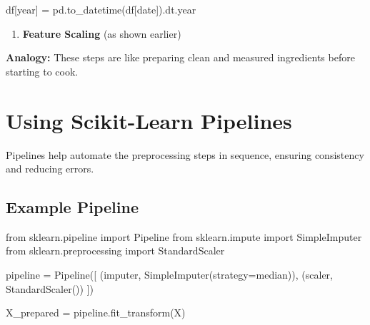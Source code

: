 \documentclass[
  letterpaper,
  DIV=11,
  numbers=noendperiod]{scrreprt}
\newenvironment{Shaded}{\begin{snugshade}}{\end{snugshade}}
\newcommand{\ImportTok}[1]{\textcolor[rgb]{0.00,0.46,0.62}{#1}}
\newcommand{\NormalTok}[1]{\textcolor[rgb]{0.00,0.23,0.31}{#1}}
\newcommand{\OperatorTok}[1]{\textcolor[rgb]{0.37,0.37,0.37}{#1}}
\newcommand{\StringTok}[1]{\textcolor[rgb]{0.13,0.47,0.30}{#1}}
\providecommand{\tightlist}{%
  \setlength{\itemsep}{0pt}\setlength{\parskip}{0pt}}\usepackage{longtable,booktabs,array}
\begin{document}
\begin{Shaded}
\begin{Highlighting}[]
\NormalTok{df[}\StringTok{\textquotesingle{}year\textquotesingle{}}\NormalTok{] }\OperatorTok{=}\NormalTok{ pd.to\_datetime(df[}\StringTok{\textquotesingle{}date\textquotesingle{}}\NormalTok{]).dt.year}
\end{Highlighting}
\end{Shaded}

\begin{enumerate}
\def\labelenumi{\arabic{enumi}.}
\setcounter{enumi}{3}
\tightlist
\item
  \textbf{Feature Scaling} (as shown earlier)
\end{enumerate}

\textbf{Analogy:} These steps are like preparing clean and measured
ingredients before starting to cook.

\section{Using Scikit-Learn
Pipelines}\label{using-scikit-learn-pipelines}

Pipelines help automate the preprocessing steps in sequence, ensuring
consistency and reducing errors.

\subsection{Example Pipeline}\label{example-pipeline}

\begin{Shaded}
\begin{Highlighting}[]
\ImportTok{from}\NormalTok{ sklearn.pipeline }\ImportTok{import}\NormalTok{ Pipeline}
\ImportTok{from}\NormalTok{ sklearn.impute }\ImportTok{import}\NormalTok{ SimpleImputer}
\ImportTok{from}\NormalTok{ sklearn.preprocessing }\ImportTok{import}\NormalTok{ StandardScaler}

\NormalTok{pipeline }\OperatorTok{=}\NormalTok{ Pipeline([}
\NormalTok{    (}\StringTok{\textquotesingle{}imputer\textquotesingle{}}\NormalTok{, SimpleImputer(strategy}\OperatorTok{=}\StringTok{\textquotesingle{}median\textquotesingle{}}\NormalTok{)),}
\NormalTok{    (}\StringTok{\textquotesingle{}scaler\textquotesingle{}}\NormalTok{, StandardScaler())}
\NormalTok{])}

\NormalTok{X\_prepared }\OperatorTok{=}\NormalTok{ pipeline.fit\_transform(X)}
\end{Highlighting}
\end{Shaded}
\end{document}
